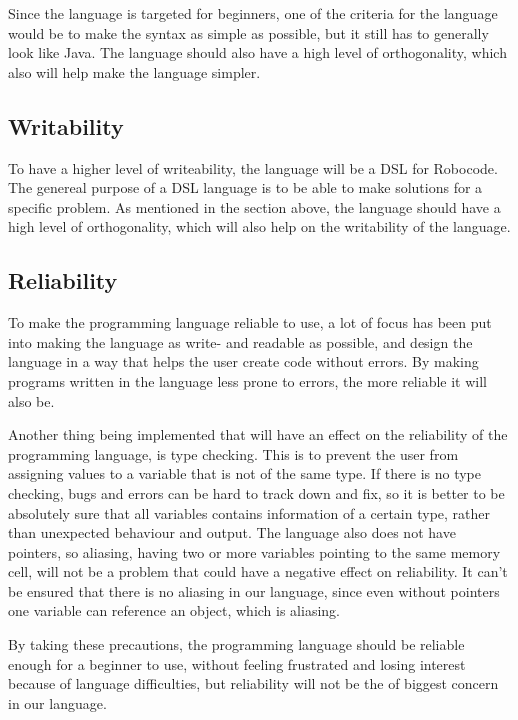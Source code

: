 Since the language is targeted for beginners, one of the criteria for the language would be to make the syntax as simple as possible, but it still has to generally look like Java. The language should also have a high level of orthogonality, which also will help make the language simpler. 

\subsection{Writability}
To have a higher level of writeability, the language will be a DSL for Robocode. The genereal purpose of a DSL language is to be able to make solutions for a specific problem. As mentioned in the section above, the language should have a high level of orthogonality, which will also help on  the writability of the language.  

\subsection{Reliability}
To make the programming language reliable to use, a lot of focus has been put into making the language as write- and readable as possible, and design the language in a way that helps the user create code without errors. By making programs written in the language less prone to errors, the more reliable it will also be.

Another thing being implemented that will have an effect on the reliability of the programming language, is type checking. This is to prevent the user from assigning values to a variable that is not of the same type. If there is no type checking, bugs and errors can be hard to track down and fix, so it is better to be absolutely sure that all variables contains information of a certain type, rather than unexpected behaviour and output. 
The language also does not have pointers, so aliasing, having two or more variables pointing to the same memory cell, will not be a problem that could have a negative effect on reliability. It can't be ensured that there is no aliasing in our language, since even without pointers one variable can reference an object, which is aliasing. 

By taking these precautions, the programming language should be reliable enough for a beginner to use, without feeling frustrated and losing interest because of language difficulties, but reliability will not be the of biggest concern in our language. 


